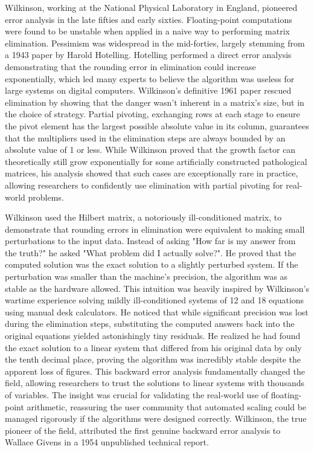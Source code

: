 Wilkinson, working at the National Physical Laboratory in England, pioneered error analysis in the late fifties and early sixties. Floating-point computations were found to be unstable when applied in a naive way to performing matrix elimination. Pessimism was widespread in the mid-forties, largely stemming from a 1943 paper by Harold Hotelling. Hotelling performed a direct error analysis demonstrating that the rounding error in elimination could increase exponentially, which led many experts to believe the algorithm was useless for large systems on digital computers. Wilkinson's definitive 1961 paper rescued elimination by showing that the danger wasn't inherent in a matrix’s size, but in the choice of strategy. Partial pivoting, exchanging rows at each stage to ensure the pivot element has the largest possible absolute value in its column, guarantees that the multipliers used in the elimination steps are always bounded by an absolute value of 1 or less. While Wilkinson proved that the growth factor can theoretically still grow exponentially for some artificially constructed pathological matrices, his analysis showed that such cases are exceptionally rare in practice, allowing researchers to confidently use elimination with partial pivoting for real-world problems.

Wilkinson used the Hilbert matrix, a notoriously ill-conditioned matrix, to demonstrate that rounding errors in elimination were equivalent to making small perturbations to the input data. Instead of asking "How far is my answer from the truth?" he asked "What problem did I actually solve?". He proved that the computed solution was the exact solution to a slightly perturbed system. If the perturbation was smaller than the machine's precision, the algorithm was as stable as the hardware allowed. This intuition was heavily inspired by Wilkinson's wartime experience solving mildly ill-conditioned systems of 12 and 18 equations using manual desk calculators. He noticed that while significant precision was lost during the elimination steps, substituting the computed answers back into the original equations yielded astonishingly tiny residuals. He realized he had found the exact solution to a linear system that differed from his original data by only the tenth decimal place, proving the algorithm was incredibly stable despite the apparent loss of figures. This backward error analysis fundamentally changed the field, allowing researchers to trust the solutions to linear systems with thousands of variables. The insight was crucial for validating the real-world use of floating-point arithmetic, reassuring the user community that automated scaling could be managed rigorously if the algorithms were designed correctly. Wilkinson, the true pioneer of the field, attributed the first genuine backward error analysis to Wallace Givens in a 1954 unpublished technical report. 

